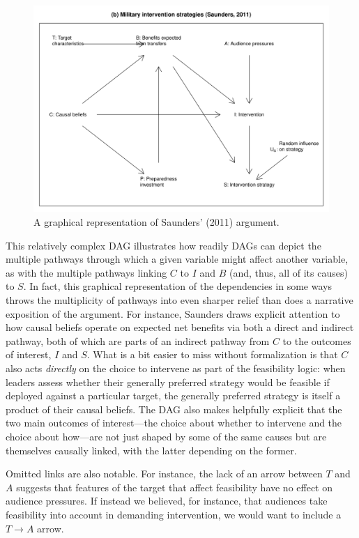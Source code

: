 \documentclass[12pt,]{book}
\begin{document}
\begin{figure}

{\centering \includegraphics[width=.7\textwidth]{ii_files/figure-latex/unnamed-chunk-8-1} 

}

\caption{\label{fig:DAGSaunders} A graphical representation of Saunders' (2011) argument.}\label{fig:unnamed-chunk-8}
\end{figure}

This relatively complex DAG illustrates how readily DAGs can depict the multiple pathways through which a given variable might affect another variable, as with the multiple pathways linking \(C\) to \(I\) and \(B\) (and, thus, all of its causes) to \(S\). In fact, this graphical representation of the dependencies in some ways throws the multiplicity of pathways into even sharper relief than does a narrative exposition of the argument. For instance, Saunders draws explicit attention to how causal beliefs operate on expected net benefits via both a direct and indirect pathway, both of which are parts of an indirect pathway from \(C\) to the outcomes of interest, \(I\) and \(S\). What is a bit easier to miss without formalization is that \(C\) also acts \emph{directly} on the choice to intervene as part of the feasibility logic: when leaders assess whether their generally preferred strategy would be feasible if deployed against a particular target, the generally preferred strategy is itself a product of their causal beliefs. The DAG also makes helpfully explicit that the two main outcomes of interest---the choice about whether to intervene and the choice about how---are not just shaped by some of the same causes but are themselves causally linked, with the latter depending on the former.

Omitted links are also notable. For instance, the lack of an arrow between \(T\) and \(A\) suggests that features of the target that affect feasibility have no effect on audience pressures. If instead we believed, for instance, that audiences take feasibility into account in demanding intervention, we would want to include a \(T \rightarrow A\) arrow.
\end{document}
